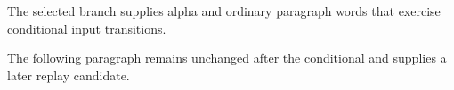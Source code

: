 
\hsize=220pt \vsize=240pt
\iftrue
The selected branch supplies alpha and ordinary paragraph words that exercise conditional input transitions.
\else
The selected branch supplies omega and ordinary paragraph words that exercise conditional input transitions.
\fi

The following paragraph remains unchanged after the conditional and supplies a later replay candidate.
\bye
